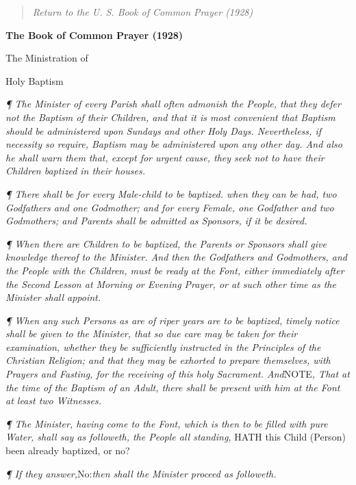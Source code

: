 \begin{quote}

\emph{Return to the U.
S. Book of Common Prayer (1928)}

\end{quote}


\textbf{The Book of Common Prayer (1928)}

The Ministration
of

Holy
Baptism

\emph{¶
The Minister of every Parish shall often admonish the People, that they
defer not the Baptism of their Children, and that it is most convenient
that Baptism should be administered upon Sundays and other Holy Days.
Nevertheless, if necessity so require, Baptism may be administered upon
any other day. And also he shall warn them that, except for urgent cause,
they seek not to have their Children baptized in their houses.}

\emph{¶
There shall be for every Male-child to be baptized. when they can be had,
two Godfathers and one Godmother; and for every Female, one Godfather
and two Godmothers; and Parents shall be admitted as Sponsors, if it be
desired.}

\emph{¶
When there are Children to be baptized, the Parents or Sponsors shall
give knowledge thereof to the Minister. And then the Godfathers and
Godmothers, and the People with the Children, must be ready at the Font,
either immediately after the Second Lesson at Morning or Evening Prayer,
or at such other time as the Minister shall appoint.}

\emph{¶
When any such Persons as are of riper years are to be baptized, timely
notice shall be given to the Minister, that so due care may be taken
for their examination, whether they be sufficiently instructed in the
Principles of the Christian Religion; and that they may be exhorted
to prepare themselves, with Prayers and Fasting, for the receiving of
this holy Sacrament. And}NOTE\emph{, That
at the time of the Baptism of an Adult, there shall be present with
him at the Font at least two Witnesses.}

\emph{}
\emph{¶
The Minister, having come to the Font, which is then to be filled with pure
Water, shall say as followeth, the People all standing,} HATH
this Child (Person) been already baptized, or no? 

\emph{¶ If they answer,}No:\emph{then shall
the Minister proceed as followeth.}

